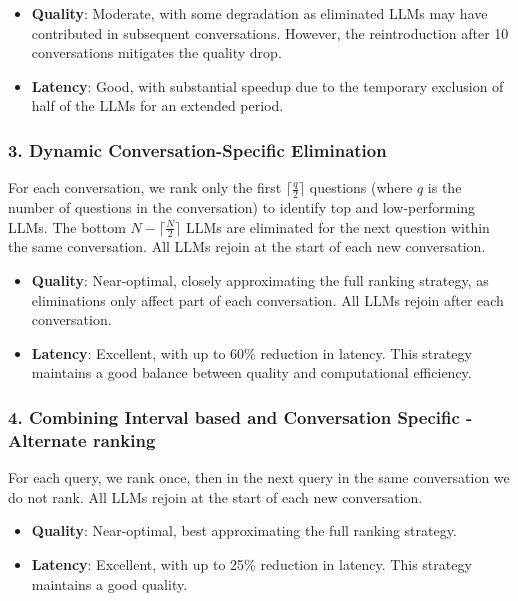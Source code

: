 \documentclass[sigconf,authordraft]{acmart}
\begin{document}
\begin{itemize}
    \item \textbf{Quality}: Moderate, with some degradation as eliminated LLMs may have contributed in subsequent conversations. However, the reintroduction after 10 conversations mitigates the quality drop.
    \item \textbf{Latency}: Good, with substantial speedup due to the temporary exclusion of half of the LLMs for an extended period.
\end{itemize}




\subsubsection{3. Dynamic Conversation-Specific Elimination}
For each conversation, we rank only the first \( \lceil \frac{q}{2} \rceil \) questions (where \( q \) is the number of questions in the conversation) to identify top and low-performing LLMs. The bottom \( N - \lceil \frac{N}{2} \rceil \) LLMs are eliminated for the next question within the same conversation. All LLMs rejoin at the start of each new conversation.

\begin{itemize}
    \item \textbf{Quality}: Near-optimal, closely approximating the full ranking strategy, as eliminations only affect part of each conversation. All LLMs rejoin after each conversation.
    \item \textbf{Latency}: Excellent, with up to 60\% reduction in latency. This strategy maintains a good balance between quality and computational efficiency.
\end{itemize}




\subsubsection{4. Combining Interval based and Conversation Specific - Alternate ranking}
For each query, we rank once, then in the next query in the same conversation we do not rank. All LLMs rejoin at the start of each new conversation.

\begin{itemize}
    \item \textbf{Quality}: Near-optimal, best approximating the full ranking strategy.
    \item \textbf{Latency}: Excellent, with up to 25\% reduction in latency. This strategy maintains a good quality.
\end{itemize}
\end{document}
